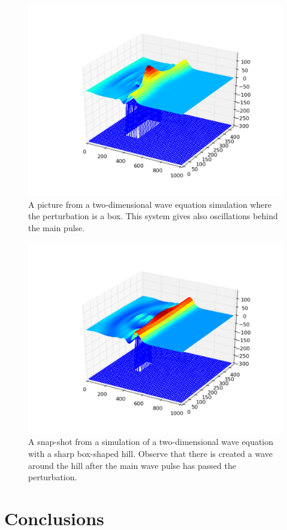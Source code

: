 \documentclass[twoside]{article}
\begin{document}
\begin{figure} 
  \centering
  \includegraphics[scale=0.4]{gustavs_codes/movie_2dwave_box/figure.pdf}
  \caption{A picture from a two-dimensional wave equation simulation where the perturbation is a box. This system gives also oscillations behind the main pulse. } \label{fig:wave_2d_box}
\end{figure}

\begin{figure} 
  \centering
  \includegraphics[scale=0.4]{gustavs_codes/movie_2dwave_box_narrow/figure.pdf}
  \caption{A snap-shot from a simulation of a two-dimensional wave equation with a sharp box-shaped hill. Observe that there is created a wave around the hill after the main wave pulse has passed the perturbation.} \label{fig:wave_2d_box_narrow}
\end{figure}



\section{Conclusions}



\printindex
\end{document}
